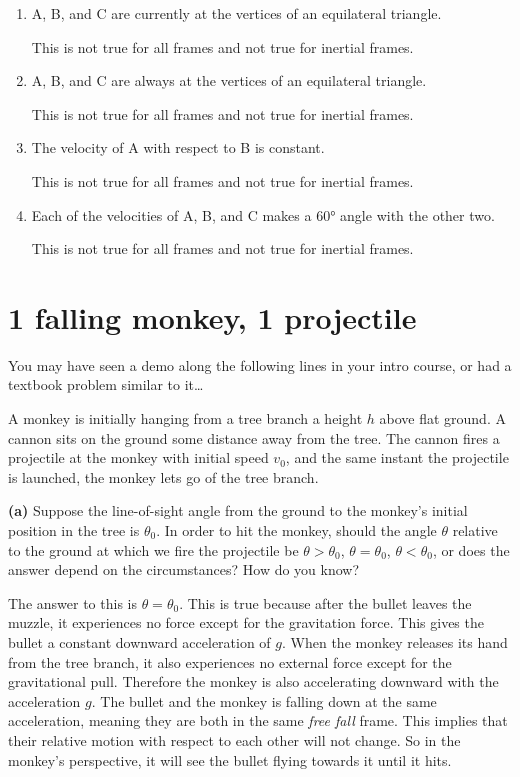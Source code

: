 \documentclass[12pt]{article}
\begin{document}
\begin{enumerate}
    \item A, B, and C are currently at the vertices of an equilateral triangle.
    
    This is not true for all frames and not true for inertial frames.


    \item A, B, and C are always at the vertices of an equilateral triangle.
    
    This is not true for all frames and not true for inertial frames.

    \item The velocity of A with respect to B is constant.

    This is not true for all frames and not true for inertial frames.

    \item Each of the velocities of A, B, and C makes a 60° angle with the other two.

    This is not true for all frames and not true for inertial frames.

\end{enumerate}

\section{1 falling monkey, 1 projectile}

You may have seen a demo along the following lines in your intro course, or had a textbook problem similar to it…

A monkey is initially hanging from a tree branch a height \(h\) above flat ground. A cannon sits on the ground some distance away from the tree. The cannon fires a projectile at the monkey with initial speed \(v_0\), and the same instant the projectile is launched, the monkey lets go of the tree branch.

\textbf{(a)} Suppose the line-of-sight angle from the ground to the monkey’s initial position in the tree is \(\theta_0\). In order to hit the monkey, should the angle \(\theta\) relative to the ground at which we fire the projectile be \(\theta > \theta_0\), \(\theta = \theta_0\), \(\theta < \theta_0\), or does the answer depend on the circumstances? How do you know?

The answer to this is $\theta = \theta_0$. This is true because after the bullet leaves the muzzle, it experiences no force except for the gravitation force. This gives the bullet a constant downward acceleration of $g$. When the monkey releases its hand from the tree branch, it also experiences no external force except for the gravitational pull. Therefore the monkey is also accelerating downward with the acceleration $g$. The bullet and the monkey is falling down at the same acceleration, meaning they are both in the same \textit{free fall} frame. This implies that their relative motion with respect to each other will not change. So in the monkey's perspective, it will see the bullet flying towards it until it hits. 
\end{document}
